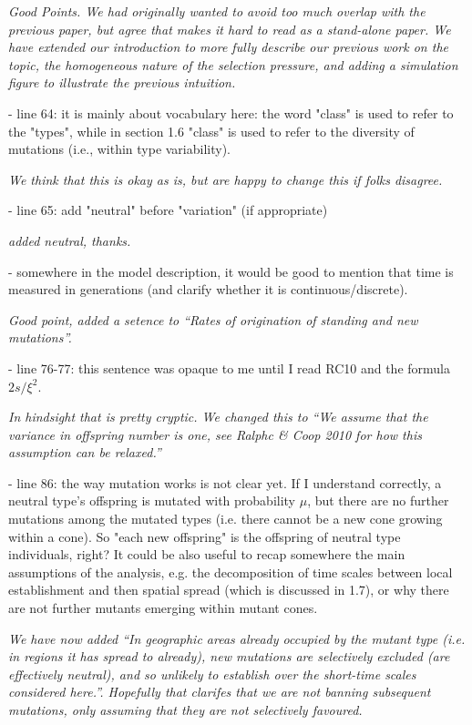 \documentclass[12pt,letterpaper]{article}
\newcommand{\response}[1]{\emph{ \color{blue} #1}}
\begin{document}
\response{Good Points. We had originally wanted to avoid too much overlap with the previous paper, but agree that makes it hard to read as a stand-alone paper. We have extended our introduction to more fully describe our previous work on the topic, the homogeneous nature of the selection pressure, and adding a simulation figure to illustrate the previous intuition. }

- line 64: it is mainly about vocabulary here: the word "class" is used to refer to the "types", while in section 1.6 "class" is used to refer to the diversity of mutations (i.e., within type variability).

\response{We think that this is okay as is, but are happy to change this if folks disagree.}


- line 65: add "neutral" before "variation" (if appropriate)

\response{added neutral, thanks.}

- somewhere in the model description, it would be good to mention that time is measured in generations (and clarify whether it is continuous/discrete).


\response{Good point, added a setence to ``Rates of origination of standing and new mutations''.}

- line 76-77: this sentence was opaque to me until I read RC10 and the formula $2s/\xi^2$.

\response{In hindsight that is pretty cryptic. We changed this to ``We assume that the variance in offspring number is one, see
  Ralphc \& Coop 2010 for how this assumption can be relaxed.''}

- line 86: the way mutation works is not clear yet. If I understand correctly, a neutral type's offspring is mutated with probability $\mu$, but there are no further mutations among the mutated types (i.e. there cannot be a new cone growing within a cone). So "each new offspring" is the offspring of neutral type individuals, right? It could be also useful to recap somewhere the main assumptions of the analysis, e.g. the decomposition of time scales between local establishment and then spatial spread (which is discussed in 1.7), or why there are not further mutants emerging within mutant cones.

\response{We have now added ``In geographic areas already
 occupied by the mutant type (i.e. in regions it has spread to already), new mutations are selectively excluded
 (are effectively neutral), and so unlikely to establish over the
 short-time scales considered here.''. Hopefully that clarifes that we are not banning subsequent mutations, only assuming that they are not selectively favoured.}
\end{document}
